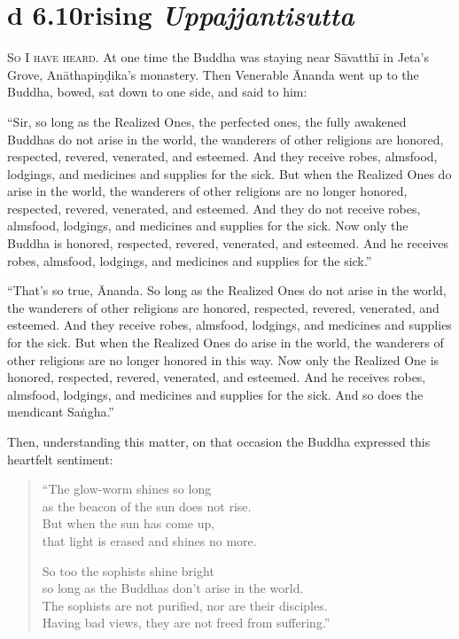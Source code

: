 \documentclass[12pt,openany]{book}%
\newcommand*{\suttatitleacronym}[1]{\smaller[2]{#1}\vspace*{.3em}}
\newcommand*{\suttatitletranslation}[1]{\linebreak{#1}}
\newcommand*{\suttatitleroot}[1]{\linebreak\smaller[2]\itshape{#1}}
\newcommand*{\tocacronym}[1]{\hspace*{-3.3em}{#1}\quad}
\newcommand*{\toctranslation}[1]{#1}
\newcommand*{\tocroot}[1]{(\textit{#1})}
\newcommand*{\scevam}[1]{\textsc{#1}}
\begin{document}
%
\section*{{\suttatitleacronym Ud 6.10}{\suttatitletranslation Arising }{\suttatitleroot Uppajjantisutta}}
\addcontentsline{toc}{section}{\tocacronym{Ud 6.10} \toctranslation{Arising } \tocroot{Uppajjantisutta}}

\scevam{So I have heard. }At one time the Buddha was staying near \textsanskrit{Sāvatthī} in Jeta’s Grove, \textsanskrit{Anāthapiṇḍika}’s monastery. Then Venerable Ānanda went up to the Buddha, bowed, sat down to one side, and said to him: 

“Sir, so long as the Realized Ones, the perfected ones, the fully awakened Buddhas do not arise in the world, the wanderers of other religions are honored, respected, revered, venerated, and esteemed. And they receive robes, almsfood, lodgings, and medicines and supplies for the sick. But when the Realized Ones do arise in the world, the wanderers of other religions are no longer honored, respected, revered, venerated, and esteemed. And they do not receive robes, almsfood, lodgings, and medicines and supplies for the sick. Now only the Buddha is honored, respected, revered, venerated, and esteemed. And he receives robes, almsfood, lodgings, and medicines and supplies for the sick.” 

“That’s so true, Ānanda. So long as the Realized Ones do not arise in the world, the wanderers of other religions are honored, respected, revered, venerated, and esteemed. And they receive robes, almsfood, lodgings, and medicines and supplies for the sick. But when the Realized Ones do arise in the world, the wanderers of other religions are no longer honored in this way. Now only the Realized One is honored, respected, revered, venerated, and esteemed. And he receives robes, almsfood, lodgings, and medicines and supplies for the sick. And so does the mendicant \textsanskrit{Saṅgha}.” 

Then, understanding this matter, on that occasion the Buddha expressed this heartfelt sentiment: 

\begin{verse}%
“The glow-worm shines so long \\
as the beacon of the sun does not rise. \\
But when the sun has come up, \\
that light is erased and shines no more. 

So too the sophists shine bright \\
so long as the Buddhas don’t arise in the world. \\
The sophists are not purified, nor are their disciples. \\
Having bad views, they are not freed from suffering.” 

%
\end{verse}
\end{document}
